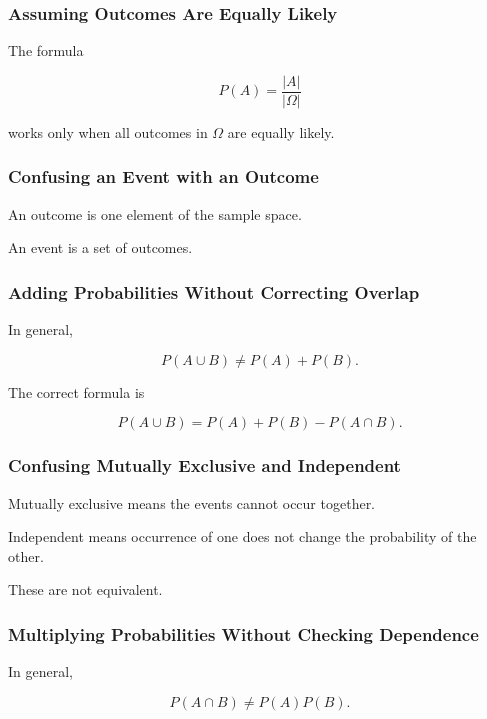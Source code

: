\subsubsection{Assuming Outcomes Are Equally Likely}

The formula

\[
P(A)
=
\frac{|A|}{|\Omega|}
\]

works only when all outcomes in \(\Omega\) are equally likely.

\subsubsection{Confusing an Event with an Outcome}

An outcome is one element of the sample space.

An event is a set of outcomes.

\subsubsection{Adding Probabilities Without Correcting Overlap}

In general,

\[
P(A\cup B)
\neq
P(A)+P(B).
\]

The correct formula is

\[
P(A\cup B)
=
P(A)+P(B)-P(A\cap B).
\]

\subsubsection{Confusing Mutually Exclusive and Independent}

Mutually exclusive means the events cannot occur together.

Independent means occurrence of one does not change the probability of
the other.

These are not equivalent.

\subsubsection{Multiplying Probabilities Without Checking Dependence}

In general,

\[
P(A\cap B)
\neq
P(A)P(B).
\]

